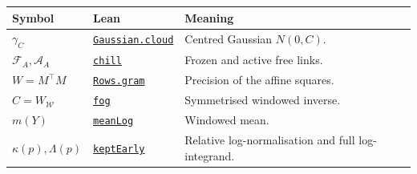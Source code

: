 \documentclass[
  letterpaper,
  11pt]{article}
\newcounter{none} %
\begin{document}
{\def\LTcaptype{none} %
\begin{longtable}[]{@{}
  >{\raggedright\arraybackslash}p{}
  >{\raggedright\arraybackslash}p{}
  >{\raggedright\arraybackslash}p{}@{}}
\toprule\noalign{}
\begin{minipage}[b]{\linewidth}\raggedright
Symbol
\end{minipage} & \begin{minipage}[b]{\linewidth}\raggedright
Lean
\end{minipage} & \begin{minipage}[b]{\linewidth}\raggedright
Meaning
\end{minipage} \\
\midrule\noalign{}
\endhead
\bottomrule\noalign{}
\endlastfoot
\(\gamma_C\) &
\href{https://github.com/yang-mills-group/OpenAI-YM-20261028/blob/3456e5e75cf8d4cd558955a5c7638fba2d68f464/YM/SectorNext/GAUSSIAN_SECTOR_CHANGE/Gaussian.lean\#L31}{\texttt{Gaussian.cloud}}
& Centred Gaussian \(N(0,C)\). \\
\(\mathcal F_A,\mathcal A_A\) &
\href{https://github.com/yang-mills-group/OpenAI-YM-20261028/blob/3456e5e75cf8d4cd558955a5c7638fba2d68f464/YM/SectorNext/GAUSSIAN_SECTOR_CHANGE/Shell.lean\#L38-L40}{\texttt{chill}}
& Frozen and active free links. \\
\(W=M^{\top}M\) &
\href{https://github.com/yang-mills-group/OpenAI-YM-20261028/blob/3456e5e75cf8d4cd558955a5c7638fba2d68f464/YM/SectorNext/GAUSSIAN_SECTOR_CHANGE/Remainder.lean\#L27}{\texttt{Rows.gram}}
& Precision of the affine squares. \\
\(C=W_{\mathcal W}\) &
\href{https://github.com/yang-mills-group/OpenAI-YM-20261028/blob/3456e5e75cf8d4cd558955a5c7638fba2d68f464/YM/SectorNext/GAUSSIAN_SECTOR_CHANGE/Chosen.lean\#L69-L70}{\texttt{fog}}
& Symmetrised windowed inverse. \\
\(m(Y)\) &
\href{https://github.com/yang-mills-group/OpenAI-YM-20261028/blob/3456e5e75cf8d4cd558955a5c7638fba2d68f464/YM/SectorNext/GAUSSIAN_SECTOR_CHANGE/Chosen.lean\#L72-L74}{\texttt{meanLog}}
& Windowed mean. \\
\(\kappa(p),\Lambda(p)\) &
\href{https://github.com/yang-mills-group/OpenAI-YM-20261028/blob/3456e5e75cf8d4cd558955a5c7638fba2d68f464/YM/PhysicalNext/AFTERNOON_INTERACTING_RANK_COMPARISON/Opacity/Prism.lean\#L50-L54}{\texttt{keptEarly}}
& Relative log-normalisation and full log-integrand. \\
\end{longtable}
}
\end{document}
